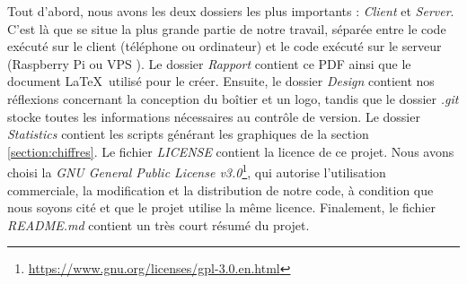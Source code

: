 \documentclass[a4paper]{article}
\begin{document}
\noindent Tout d’abord, nous avons les deux dossiers les plus importants : \emph{Client} et  \emph{Server}. C’est là que se situe la plus grande partie de notre travail, séparée entre le code exécuté sur le client (téléphone ou ordinateur) et le code exécuté sur le serveur (Raspberry Pi ou VPS \cite{vps}). Le dossier \emph{Rapport} contient ce PDF ainsi que le document \LaTeX\ utilisé pour le créer. Ensuite, le dossier \emph{Design} contient nos réflexions concernant la conception du boîtier et un logo, tandis que le dossier \emph{.git} stocke toutes les informations nécessaires au contrôle de version. Le dossier \emph{Statistics} contient les scripts générant les graphiques de la section \ref{section:chiffres}. Le fichier \emph{LICENSE} contient la licence de ce projet. Nous avons choisi la \textit{GNU General Public License v3.0}\footnote{\url{https://www.gnu.org/licenses/gpl-3.0.en.html}}, qui autorise l'utilisation commerciale, la modification et la distribution de notre code, à condition que nous soyons cité et que le projet utilise la même licence. Finalement, le fichier \emph{README.md} contient un très court résumé du projet.
\end{document}

